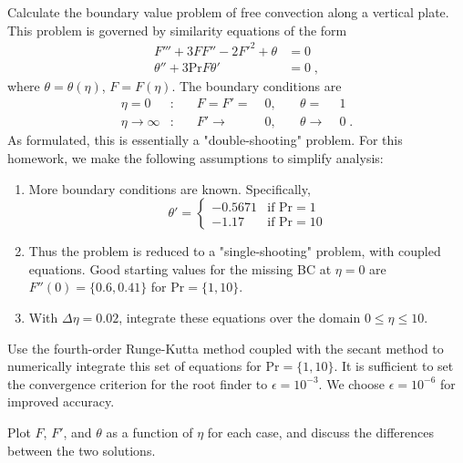 \documentclass[12pt]{article}
\begin{document}
Calculate the boundary value problem of free convection along a vertical plate. This problem is governed by similarity equations of the form
\begin{equation}
\begin{aligned}
F''' + 3 F F'' - 2F'^2 + \theta &= 0 \\
\theta'' + 3 \text{Pr} F \theta' &= 0
\;,
\end{aligned}
\end{equation}
where $\theta = \theta(\eta)$, $F = F(\eta)$. The boundary conditions are
\begin{equation}
\begin{aligned}
\eta = 0 &: &\quad F = F' =\; &0, &\quad \theta =\; &1 \\
\eta \rightarrow \infty &: &\quad F' \rightarrow\; &0, &\quad \theta \rightarrow\; &0
\;.
\end{aligned}
\end{equation}
As formulated, this is essentially a "double-shooting" problem. For this homework, we make the following assumptions to simplify analysis:
\begin{enumerate}
\item More boundary conditions are known. Specifically,
\begin{equation}
\theta' =
\begin{cases}
-0.5671 &\text{if Pr} = 1 \\
-1.17 &\text{if Pr} = 10
\end{cases}
\end{equation}
\item Thus the problem is reduced to a "single-shooting" problem, with coupled equations. Good starting values for the missing BC at $\eta = 0$ are $F''(0) = \{0.6, 0.41\}$ for $\text{Pr} = \{1, 10\}$.
\item With $\Delta\eta = 0.02$, integrate these equations over the domain $0 \le \eta \le 10$.
\end{enumerate}

Use the fourth-order Runge-Kutta method coupled with the secant method to numerically integrate this set of equations for $\text{Pr} = \{1,10\}$. It is sufficient to set the convergence criterion for the root finder to $\epsilon = 10^{-3}$. We choose $\epsilon = 10^{-6}$ for improved accuracy.

Plot $F$, $F'$, and $\theta$ as a function of $\eta$ for each case, and discuss the differences between the two solutions.

\end{document}
